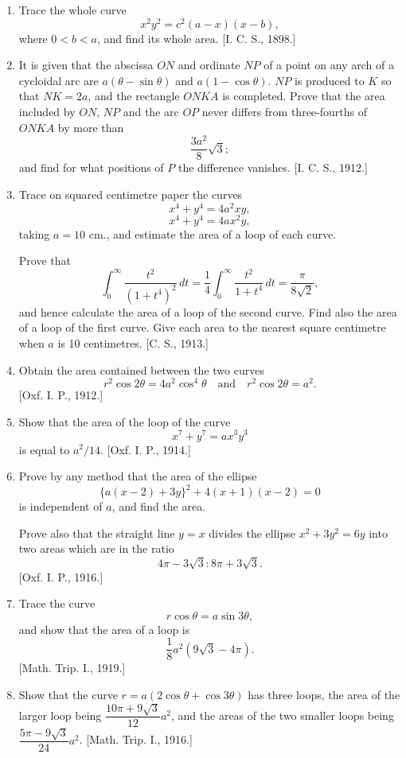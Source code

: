 \documentclass[11pt, a4paper]{article}
\newcommand{\source}[1]{\hfill\textnormal{[#1]}}
\begin{document}
\begin{enumerate}[leftmargin=2em]
\item Trace the whole curve
\[
x^2y^2=c^2(a-x)(x-b),
\]
where $0<b<a$, and find its whole area. \source{I. C. S., 1898.}

\item It is given that the abscissa $ON$ and ordinate $NP$ of a point on any arch of a cycloidal arc are $a(\theta-\sin\theta)$ and $a(1-\cos\theta)$. $NP$ is produced to $K$ so that $NK=2a$, and the rectangle $ONKA$ is completed. Prove that the area included by $ON$, $NP$ and the arc $OP$ never differs from three-fourths of $ONKA$ by more than
\[
\frac{3a^2}{8}\sqrt3;
\]
and find for what positions of $P$ the difference vanishes. \source{I. C. S., 1912.}

\item Trace on squared centimetre paper the curves
\[
x^4+y^4=4a^2xy,
\]
\[
x^4+y^4=4ax^2y,
\]
taking $a=10$ cm., and estimate the area of a loop of each curve.

Prove that
\[
\int_0^\infty\frac{t^2}{(1+t^4)^2}\,dt=\frac14\int_0^\infty\frac{t^2}{1+t^4}\,dt=\frac{\pi}{8\sqrt2},
\]
and hence calculate the area of a loop of the second curve. Find also the area of a loop of the first curve. Give each area to the nearest square centimetre when $a$ is 10 centimetres. \source{C. S., 1913.}

\item Obtain the area contained between the two curves
\[
r^2\cos2\theta=4a^2\cos^4\theta\quad\text{and}\quad r^2\cos2\theta=a^2.
\]
\source{Oxf. I. P., 1912.}

\item Show that the area of the loop of the curve
\[
x^7+y^7=ax^3y^3
\]
is equal to $a^2/14$. \source{Oxf. I. P., 1914.}

\item Prove by any method that the area of the ellipse
\[
\{a(x-2)+3y\}^2+4(x+1)(x-2)=0
\]
is independent of $a$, and find the area.

Prove also that the straight line $y=x$ divides the ellipse $x^2+3y^2=6y$ into two areas which are in the ratio
\[
4\pi-3\sqrt3:8\pi+3\sqrt3.
\]
\source{Oxf. I. P., 1916.}

\item Trace the curve
\[
r\cos\theta=a\sin3\theta,
\]
and show that the area of a loop is
\[
\frac18a^2(9\sqrt3-4\pi).
\]
\source{Math. Trip. I., 1919.}

\item Show that the curve $r=a(2\cos\theta+\cos3\theta)$ has three loops, the area of the larger loop being $\dfrac{10\pi+9\sqrt3}{12}a^2$, and the areas of the two smaller loops being $\dfrac{5\pi-9\sqrt3}{24}a^2$. \source{Math. Trip. I., 1916.}


\end{enumerate}
\end{document}
